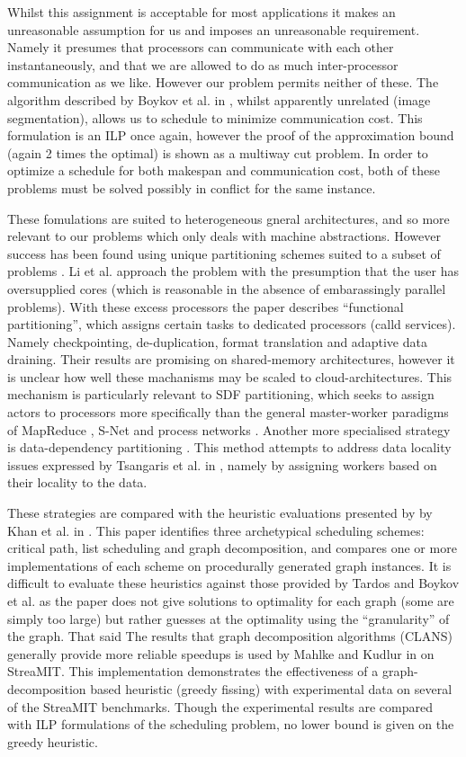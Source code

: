 Whilst this assignment is acceptable for most applications it makes an unreasonable assumption for us and imposes an unreasonable requirement.
Namely it presumes that processors can communicate with each other instantaneously, and that we are allowed to do as much inter-processor communication as we like.
However our problem permits neither of these.
The algorithm described by Boykov et al. in \cite{boy01}, whilst apparently unrelated (image segmentation), allows us to schedule to minimize communication cost.
This formulation is an ILP once again, however the proof of the approximation bound (again 2 times the optimal) is shown as a multiway cut problem.
In order to optimize a schedule for both makespan and communication cost, both of these problems must be solved possibly in conflict for the same instance.

These fomulations are suited to heterogeneous gneral architectures, and so more relevant to our problems which only deals with machine abstractions.
However success has been found using unique partitioning schemes suited to a subset of problems \cite{dea08, li10, tsa09}.
Li et al. approach the problem with the presumption that the user has oversupplied cores \cite{li10} (which is reasonable in the absence of embarassingly parallel problems).
With these excess processors the paper describes ``functional partitioning'', which assigns certain tasks to dedicated processors (calld services).
Namely checkpointing, de-duplication, format translation and adaptive data draining.
Their results are promising on shared-memory architectures, however it is unclear how well these machanisms may be scaled to cloud-architectures.
This mechanism is particularly relevant to SDF partitioning, which seeks to assign actors to processors more specifically than the general master-worker paradigms of MapReduce \cite{dea08}, S-Net \cite{pen09} and process networks \cite{par03}.
Another more specialised strategy is data-dependency partitioning \cite{dea08}.
This method attempts to address data locality issues expressed by Tsangaris et al. in \cite{tsa09}, namely by assigning workers based on their locality to the data.

These strategies are compared with the heuristic evaluations presented by \cite{len87, boy01} by Khan et al. in \cite{kha94}.
This paper identifies three archetypical scheduling schemes: critical path, list scheduling and graph decomposition, and compares one or more implementations of each scheme on procedurally generated graph instances.
It is difficult to evaluate these heuristics against those provided by Tardos \cite{len87} and Boykov et al. \cite{boy01} as the paper does not give solutions to optimality for each graph (some are simply too large) but rather guesses at the optimality using the ``granularity'' of the graph.
That said The results that graph decomposition algorithms (CLANS) generally provide more reliable speedups \cite{kha94} is used by Mahlke and Kudlur in \cite{mal08} on StreaMIT.
This implementation demonstrates the effectiveness of a graph-decomposition based heuristic (greedy fissing) with experimental data on several of the StreaMIT benchmarks.
Though the experimental results are compared with ILP formulations of the scheduling problem, no lower bound is given on the greedy heuristic.

